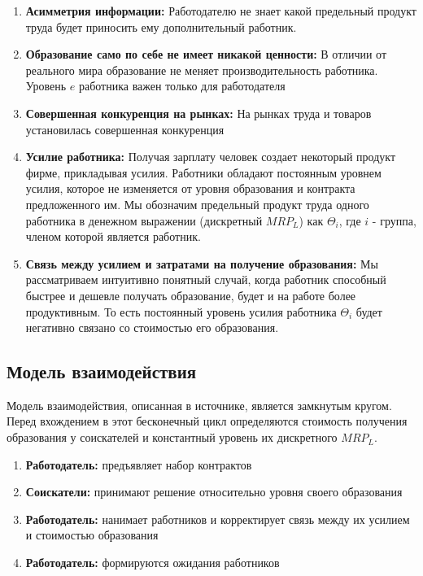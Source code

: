 \begin{enumerate}
    \item \textbf{Асимметрия информации:} Работодателю не знает какой предельный продукт труда будет приносить ему
    дополнительный работник.
    \item \textbf{Образование само по себе не имеет никакой ценности:} В отличии от реального мира образование не
    меняет производительность работника. Уровень $e$ работника важен только для работодателя
    \item \textbf{Совершенная конкуренция на рынках:} На рынках труда и товаров установилась совершенная конкуренция
    \item \textbf{Усилие работника:} Получая зарплату человек создает некоторый продукт фирме, прикладывая усилия.
    Работники обладают постоянным уровнем усилия, которое не изменяется от уровня образования и контракта
    предложенного им. Мы обозначим предельный продукт труда одного работника в денежном выражении (дискретный $MRP_L$)
    как $\Theta_i$, где $i$ - группа, членом которой является работник.
    \item \textbf{Связь между усилием и затратами на получение образования:} Мы рассматриваем интуитивно понятный
    случай, когда работник способный быстрее и дешевле получать образование, будет и на работе более продуктивным. То
    есть постоянный уровень усилия работника $\Theta_i$ будет негативно связано со стоимостью его образования.
\end{enumerate}

\subsection{Модель взаимодействия}

\indent\setlength{\parindent}{1em}Модель взаимодействия, описанная в источнике, является замкнутым кругом. Перед
вхождением в этот бесконечный цикл определяются стоимость получения образования у соискателей и константный уровень их
дискретного $MRP_L$.

\begin{enumerate}
    \item \textbf{Работодатель:} предъявляет набор контрактов
    \item \textbf{Соискатели:} принимают решение относительно уровня своего образования
    \item \textbf{Работодатель:} нанимает работников и корректирует связь между их усилием и стоимостью образования
    \item \textbf{Работодатель:} формируются ожидания работников
\end{enumerate}

